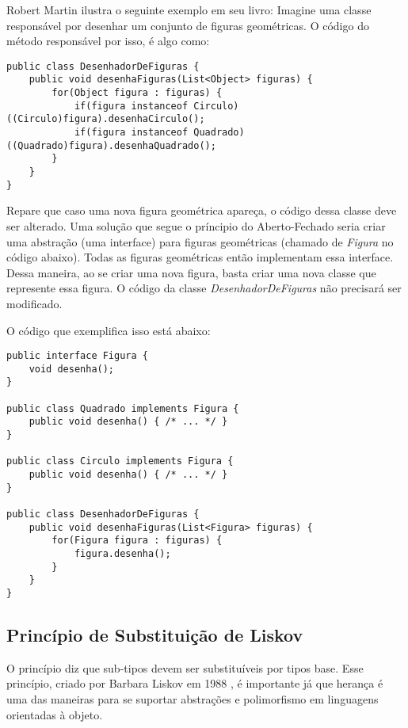 Robert Martin \cite{bob-martin} ilustra o seguinte exemplo em seu livro: Imagine uma classe responsável por desenhar 
um conjunto de figuras geométricas. O código do método responsável por isso, é algo como:

\begin{lstlisting}[frame=trbl]
public class DesenhadorDeFiguras {
	public void desenhaFiguras(List<Object> figuras) {
		for(Object figura : figuras) {
			if(figura instanceof Circulo) ((Circulo)figura).desenhaCirculo();
			if(figura instanceof Quadrado) ((Quadrado)figura).desenhaQuadrado();
		}
	}
}
\end{lstlisting}

Repare que caso uma nova figura geométrica apareça, o código dessa classe deve ser alterado. Uma solução que segue
o príncipio do Aberto-Fechado seria criar uma abstração (uma interface) para figuras geométricas (chamado de \textit{Figura} no código abaixo).
Todas as figuras geométricas então implementam essa interface. Dessa maneira, ao se criar uma nova figura, basta criar uma nova classe
que represente essa figura. O código da classe \textit{DesenhadorDeFiguras} não precisará ser modificado.

O código que exemplifica isso está abaixo:

\begin{lstlisting}[frame=trbl]
public interface Figura {
	void desenha();
}

public class Quadrado implements Figura {
	public void desenha() { /* ... */ }
}

public class Circulo implements Figura {
	public void desenha() { /* ... */ }
}

public class DesenhadorDeFiguras {
	public void desenhaFiguras(List<Figura> figuras) {
		for(Figura figura : figuras) {
			figura.desenha();
		}
	}
}
\end{lstlisting}

\subsection{Princípio de Substituição de Liskov}
\label{subsec:lsp}

O princípio diz que sub-tipos devem ser substituíveis por tipos base. Esse princípio, criado por Barbara Liskov em 1988 \cite{liskov},
é importante já que herança é uma das maneiras para se suportar abstrações e polimorfismo em linguagens orientadas à objeto.

